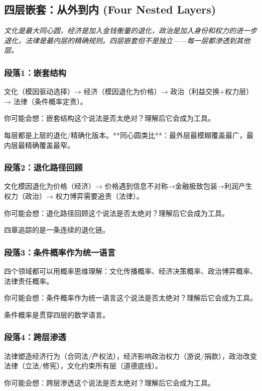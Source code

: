 \documentclass[a4paper,12pt]{book}
\newenvironment{motivation}{\begin{tcolorbox}[colback=gray!10,colframe=gray!60,title=\textit{动机}]\small\itshape}{\end{tcolorbox}}
\begin{document}
\begin{motivation}
\begin{motivation}
\begin{motivation}
\begin{motivation}
\begin{motivation}
	\subsection{四层嵌套：从外到内 (Four Nested Layers)}
	\begin{motivation}
		文化是最大同心圆，经济是加入金钱衡量的退化，政治是加入身份和权力的进一步退化，法律是最内层的精确规则。四层嵌套但不是独立——每一层都渗透到其他层。
	\end{motivation}

	\subsubsection*{段落1：嵌套结构}
	文化（模因驱动选择）→ 经济（模因退化为价格）→ 政治（利益交换+权力层）→ 法律（条件概率定责）。
	\begin{tcolorbox}[colback=yellow!5, title=\textit{读者行为预测}]
		你可能会想：嵌套结构这个说法是否太绝对？理解后它会成为工具。
	\end{tcolorbox}

每层都是上层的退化/精确化版本。**同心圆类比**：最外层最模糊覆盖最广，最内层最精确覆盖最窄。

	\subsubsection*{段落2：退化路径回顾}
	文化模因退化为价格（经济）→ 价格遇到信息不对称→金融极致包装→利润产生权力（政治）→ 权力博弈需要追责（法律）。
	\begin{tcolorbox}[colback=yellow!5, title=\textit{读者行为预测}]
		你可能会想：退化路径回顾这个说法是否太绝对？理解后它会成为工具。
	\end{tcolorbox}

四章追踪的是一条连续的退化链。

	\subsubsection*{段落3：条件概率作为统一语言}
	四个领域都可以用概率思维理解：文化传播概率、经济决策概率、政治博弈概率、法律责任概率。
	\begin{tcolorbox}[colback=yellow!5, title=\textit{读者行为预测}]
		你可能会想：条件概率作为统一语言这个说法是否太绝对？理解后它会成为工具。
	\end{tcolorbox}

条件概率是贯穿四层的数学语言。

	\subsubsection*{段落4：跨层渗透}
	法律塑造经济行为（合同法/产权法），经济影响政治权力（游说/捐款），政治改变法律（立法/修宪），文化约束所有层（道德底线）。
	\begin{tcolorbox}[colback=yellow!5, title=\textit{读者行为预测}]
		你可能会想：跨层渗透这个说法是否太绝对？理解后它会成为工具。
	\end{tcolorbox}


\end{motivation}
\end{motivation}
\end{motivation}
\end{motivation}
\end{motivation}
\end{document}
